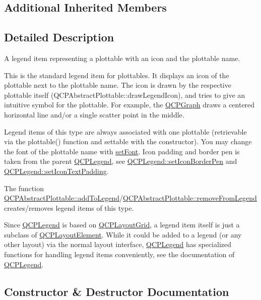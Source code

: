 \subsection*{Additional Inherited Members}


\subsection{Detailed Description}
A legend item representing a plottable with an icon and the plottable name. 

This is the standard legend item for plottables. It displays an icon of the plottable next to the plottable name. The icon is drawn by the respective plottable itself (Q\+C\+P\+Abstract\+Plottable\+::draw\+Legend\+Icon), and tries to give an intuitive symbol for the plottable. For example, the \hyperlink{classQCPGraph}{Q\+C\+P\+Graph} draws a centered horizontal line and/or a single scatter point in the middle.

Legend items of this type are always associated with one plottable (retrievable via the plottable() function and settable with the constructor). You may change the font of the plottable name with \hyperlink{classQCPAbstractLegendItem_a409c53455d8112f71d70c0c43eb10265}{set\+Font}. Icon padding and border pen is taken from the parent \hyperlink{classQCPLegend}{Q\+C\+P\+Legend}, see \hyperlink{classQCPLegend_a2f2c93d18a651f4ff294bb3f026f49b8}{Q\+C\+P\+Legend\+::set\+Icon\+Border\+Pen} and \hyperlink{classQCPLegend_a62973bd69d5155e8ea3141366e8968f6}{Q\+C\+P\+Legend\+::set\+Icon\+Text\+Padding}.

The function \hyperlink{classQCPAbstractPlottable_aa64e93cb5b606d8110d2cc0a349bb30f}{Q\+C\+P\+Abstract\+Plottable\+::add\+To\+Legend}/\hyperlink{classQCPAbstractPlottable_a3cc235007e2343a65ad4f463767e0e20}{Q\+C\+P\+Abstract\+Plottable\+::remove\+From\+Legend} creates/removes legend items of this type.

Since \hyperlink{classQCPLegend}{Q\+C\+P\+Legend} is based on \hyperlink{classQCPLayoutGrid}{Q\+C\+P\+Layout\+Grid}, a legend item itself is just a subclass of \hyperlink{classQCPLayoutElement}{Q\+C\+P\+Layout\+Element}. While it could be added to a legend (or any other layout) via the normal layout interface, \hyperlink{classQCPLegend}{Q\+C\+P\+Legend} has specialized functions for handling legend items conveniently, see the documentation of \hyperlink{classQCPLegend}{Q\+C\+P\+Legend}. 

\subsection{Constructor \& Destructor Documentation}
\mbox{\label{classQCPPlottableLegendItem_ac1072591fe409d3dabad51b23ee4d6c5}} 
